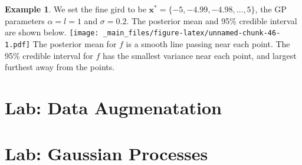 \documentclass[
]{book}
\theoremstyle{definition}
\theoremstyle{definition}
\newtheorem{example}{Example}[chapter]
\theoremstyle{definition}
\theoremstyle{definition}
\theoremstyle{remark}
\begin{document}
\begin{example}
We set the fine gird to be \(\boldsymbol{x}^* = \{-5, -4.99, -4.98, \ldots, 5\}\), the GP parameters \(\alpha = l = 1\) and \(\sigma = 0.2\). The posterior mean and 95\% credible interval are shown below.
\texttt{[image: \_main\_files/figure-latex/unnamed-chunk-46-1.pdf]}
The posterior mean for \(f\) is a smooth line passing near each point. The 95\% credible interval for \(f\) has the smallest variance near each point, and largest furthest away from the points.
\end{example}

\hypertarget{lab-data-augmenatation}{%
\section{Lab: Data Augmenatation}\label{lab-data-augmenatation}}

\hypertarget{lab-gaussian-processes}{%
\section{Lab: Gaussian Processes}\label{lab-gaussian-processes}}

  
\end{document}
